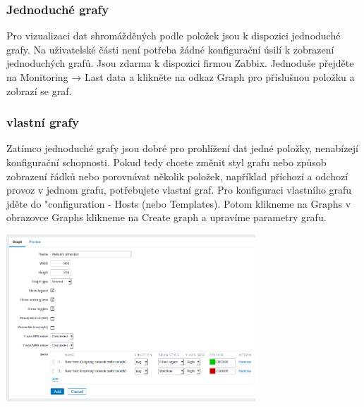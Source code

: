 \documentclass{article}
\begin{document}
\subsubsection{Jednoduché grafy}
Pro vizualizaci dat shromážděných podle položek jsou k dispozici jednoduché grafy.\newline
Na uživatelské části není potřeba žádné konfigurační úsilí k zobrazení jednoduchých grafů. Jsou zdarma k dispozici firmou Zabbix.\newline
Jednoduše přejděte na Monitoring → Last data a klikněte na odkaz Graph pro příslušnou položku a zobrazí se graf.
\subsubsection{vlastní grafy}
Zatímco jednoduché grafy jsou dobré pro prohlížení dat jedné položky, nenabízejí konfigurační schopnosti.
\newline
Pokud tedy chcete změnit styl grafu nebo způsob zobrazení řádků nebo porovnávat několik položek, například příchozí a odchozí provoz v jednom grafu, potřebujete vlastní graf.
\newline
Pro konfiguraci vlastního grafu  jděte do "configuration - Hosts (nebo Templates). Potom klikneme na Graphs v obrazovce Graphs klikneme na Create graph a upravíme parametry grafu.
\begin{center}
        \includegraphics[width=0.7\textwidth]{obrazky/graph.png}
   \end{center}
\end{document}

